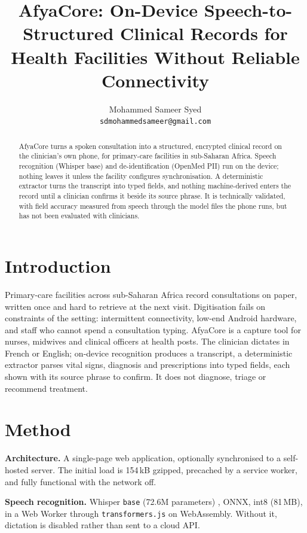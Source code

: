 \documentclass[10pt,letterpaper]{article}
\title{\vspace{-2.5em}AfyaCore: On-Device Speech-to-Structured Clinical Records
for Health Facilities Without Reliable Connectivity}
\author{Mohammed Sameer Syed\\ \texttt{sdmohammedsameer@gmail.com}}
\date{}
\providecommand{\citep}{\cite}
\begin{document}
\maketitle

\begin{abstract}
AfyaCore turns a spoken consultation into a structured, encrypted clinical
record on the clinician's own phone, for primary-care facilities in sub-Saharan
Africa. Speech recognition (Whisper base) and de-identification (OpenMed PII)
run on the device; nothing leaves it unless the facility configures
synchronisation. A deterministic extractor turns the transcript into typed
fields, and nothing machine-derived enters the record until a clinician
confirms it beside its source phrase. It is technically validated, with field accuracy measured from speech through
the model files the phone runs, but has not been evaluated with clinicians.
\end{abstract}

\section{Introduction}

Primary-care facilities across sub-Saharan Africa record consultations on
paper, written once and hard to retrieve at the next visit. Digitisation fails
on constraints of the setting: intermittent connectivity, low-end Android
hardware, and staff who cannot spend a consultation typing. AfyaCore is a capture tool for nurses, midwives and clinical officers at health
posts. The clinician dictates in French or English; on-device recognition
produces a transcript, a deterministic extractor parses vital signs, diagnosis
and prescriptions into typed fields, each shown with its source phrase to
confirm. It does not diagnose, triage or recommend treatment.

\section{Method}

\textbf{Architecture.} A single-page web application, optionally synchronised
to a self-hosted server. The initial load is 154\,kB gzipped, precached by a
service worker, and fully functional with the network off.

\textbf{Speech recognition.} Whisper \texttt{base} (72.6M parameters)
\citep{radford2022whisper}, ONNX, int8 (81\,MB), in a Web Worker through
\texttt{transformers.js} on WebAssembly. Without it, dictation is disabled
rather than sent to a cloud API.
\end{document}
